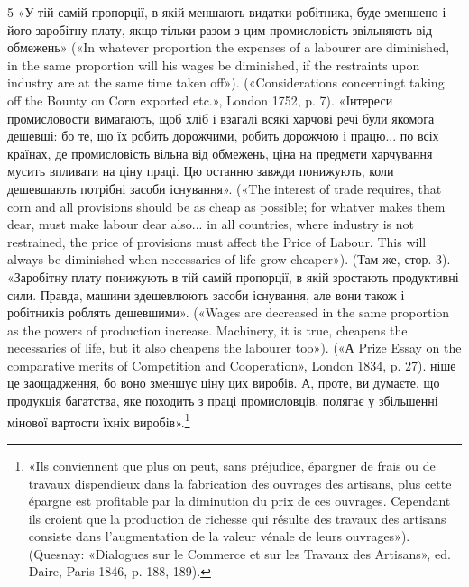 5 «У тій самій пропорції, в якій меншають видатки робітника, буде
зменшено і його заробітну плату, якщо тільки разом з цим промисловість
звільняють від обмежень» («In whatever proportion the expenses of a
labourer are diminished, in the same proportion will his wages be diminished,
if the restraints upon industry are at the same time taken off»).
(«Considerations concerningt taking off the Bounty on Corn exported etc.»,
London 1752, p. 7). «Інтереси промисловости вимагають, щоб хліб і
взагалі всякі харчові речі були якомога дешевші: бо те, що їх робить
дорожчими, робить дорожчою і працю... по всіх країнах, де промисловість вільна від обмежень, ціна на
предмети харчування мусить впливати
на ціну праці. Цю останню завжди понижують, коли дешевшають потрібні
засоби існування». («The interest of trade requires, that corn and all provisions should be as cheap
as possible; for whatver makes them dear, must
make labour dear also... in all countries, where industry is not restrained,
the price of provisions must affect the Price of Labour. This will always
be diminished when necessaries of life grow cheaper»). (Там же, стор. 3).
«Заробітну плату понижують в тій самій пропорції, в якій зростають
продуктивні сили. Правда, машини здешевлюють засоби існування, але
вони також і робітників роблять дешевшими». («Wages are decreased
in the same proportion as the powers of production increase. Machinery,
it is true, cheapens the necessaries of life, but it also cheapens the labourer
too»). («А Prize Essay on the comparative merits of Competition and
Cooperation», London 1834, p. 27).
ніше це заощадження, бо воно зменшує ціну цих виробів. А, проте,
ви думаєте, що продукція багатства, яке походить з праці промисловців, полягає у збільшенні мінової
вартости їхніх виробів».\footnote{
«Ils conviennent que plus on peut, sans préjudice, épargner de frais ou
de travaux dispendieux dans la fabrication des ouvrages des artisans, plus
cette épargne est profitable par la diminution du prix de ces ouvrages.
Cependant ils croient que la production de richesse qui résulte des travaux
des artisans consiste dans l’augmentation de la valeur vénale de leurs ouvrages»).
(Quesnay: «Dialogues sur le Commerce et sur les Travaux des
Artisans», ed. Daire, Paris 1846, p. 188, 189).
}

